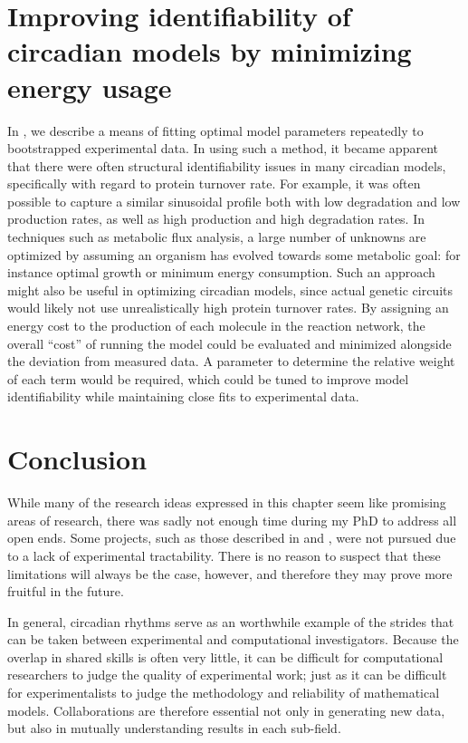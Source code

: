 \section{Improving identifiability of circadian models by minimizing energy usage}

In , we describe a means of fitting optimal model parameters repeatedly to bootstrapped experimental data.
In using such a method, it became apparent that there were often structural identifiability issues in many circadian models, specifically with regard to protein turnover rate.
For example, it was often possible to capture a similar sinusoidal profile both with low degradation and low production rates, as well as high production and high degradation rates.
In techniques such as metabolic flux analysis, a large number of unknowns are optimized by assuming an organism has evolved towards some metabolic goal: for instance optimal growth or minimum energy consumption.
Such an approach might also be useful in optimizing circadian models, since actual genetic circuits would likely not use unrealistically high protein turnover rates.
By assigning an energy cost to the production of each molecule in the reaction network, the overall ``cost'' of running the model could be evaluated and minimized alongside the deviation from measured data.
A parameter to determine the relative weight of each term would be required, which could be tuned to improve model identifiability while maintaining close fits to experimental data.

\section{Conclusion}

While many of the research ideas expressed in this chapter seem like promising areas of research, there was sadly not enough time during my PhD to address all open ends.
Some projects, such as those described in  and , were not pursued due to a lack of experimental tractability.
There is no reason to suspect that these limitations will always be the case, however, and therefore they may prove more fruitful in the future.

In general, circadian rhythms serve as an worthwhile example of the strides that can be taken between experimental and computational investigators.
Because the overlap in shared skills is often very little, it can be difficult for computational researchers to judge the quality of experimental work; just as it can be difficult for experimentalists to judge the methodology and reliability of mathematical models.
Collaborations are therefore essential not only in generating new data, but also in mutually understanding results in each sub-field.



